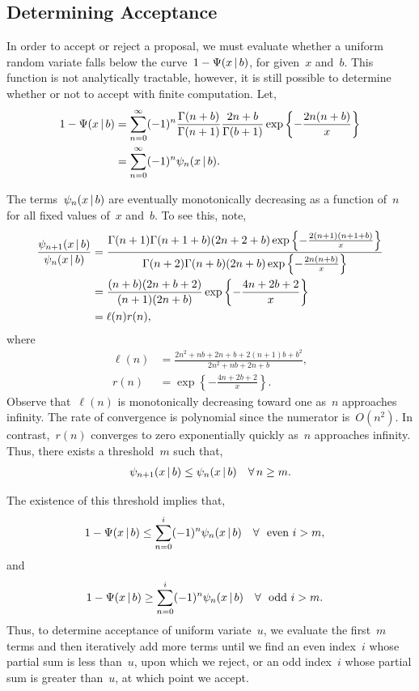 \documentclass[aos,preprint]{imsart}
\begin{document}
\subsection{Determining Acceptance}
In order to accept or reject a proposal, we must evaluate whether a uniform random variate 
falls below the curve~$1-\Psi(x \,|\, b)$, for given~$x$ and~$b$. This function is 
not analytically tractable, however, it is still possible to determine whether or not to accept 
with finite computation.
Let,
\begin{align}
1-\Psi(x \given b) 
  &=
    \sum_{n=0}^\infty (-1)^n \frac{\Gamma(n+b)}{\Gamma(n+1)} \frac{2n+b}{\Gamma(b+1)}
    \exp\left\{- \frac{2n(n+b)}{x} \right\} \\
  &= \sum_{n=0}^\infty (-1)^n \psi_n(x \given b).
\end{align}

The terms~$\psi_n(x \,|\, b)$ are eventually monotonically decreasing as a function of~$n$ 
for all fixed values of~$x$ and~$b$. To see this, note,
\begin{align}
\frac{\psi_{n+1}(x \given b)}{\psi_n(x \given b)} &= 
\frac{ \Gamma(n+1) \Gamma(n+1+b) (2n + 2 + b) \exp \left \{ - \frac{2(n+1)(n+1+b)}{x} \right \}}
{ \Gamma(n+2) \Gamma(n+b) (2n + b) \exp \left \{ - \frac{2n(n+b)}{x} \right \}} \\
&= 
\frac{(n+b)(2n+b+2)}{(n+1)(2n+b)} 
\exp \left \{ -\frac{4n +2b +2}{x}  \right \} \\
&= \ell(n) r(n),
\end{align}
where
\begin{align}
\ell(n) &= \frac{2n^2+nb+2n+b + 2(n+1)b + b^2}{2n^2+nb+2n+b}, \\
r(n) &= \exp \left \{ -\frac{4n +2b +2}{x}  \right \}.
\end{align}
Observe that~$\ell(n)$ is monotonically decreasing toward one as~$n$ approaches infinity. 
The rate of convergence is polynomial since the numerator is~${O(n^2)}$.
In contrast,~$r(n)$ converges to zero exponentially quickly as~$n$ approaches infinity. 
Thus, there exists a threshold~$m$ such that,
\begin{align}
\psi_{n+1}(x \given b) \leq \psi_{n}(x \given b) \quad \forall \, n \geq m.
\end{align}

The existence of this threshold implies that,
\begin{align}
1 - \Psi(x \given b) &\leq \sum_{n=0}^i (-1)^n \psi_n(x \given b) \quad \forall~\text{ even } i > m,
\end{align} 
and
\begin{align}
1 - \Psi(x \given b) &\geq \sum_{n=0}^i (-1)^n \psi_n(x \given b) \quad \forall~\text{ odd } i > m.
\end{align} 
Thus, to determine acceptance of uniform variate~$u$, we evaluate the first~$m$ terms and then iteratively add more terms 
until we find an even index~$i$ whose partial sum is less than~$u$, upon which we reject, or an odd index~$i$ whose partial
sum is greater than~$u$, at which point we accept. 
\end{document}

